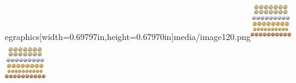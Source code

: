egraphics[width=0.69797in,height=0.67970in]{media/image120.png}\includegraphics[width=0.69797in,height=0.67970in]{media/image120.png}\includegraphics[width=0.69797in,height=0.67970in]{media/image120.png}

